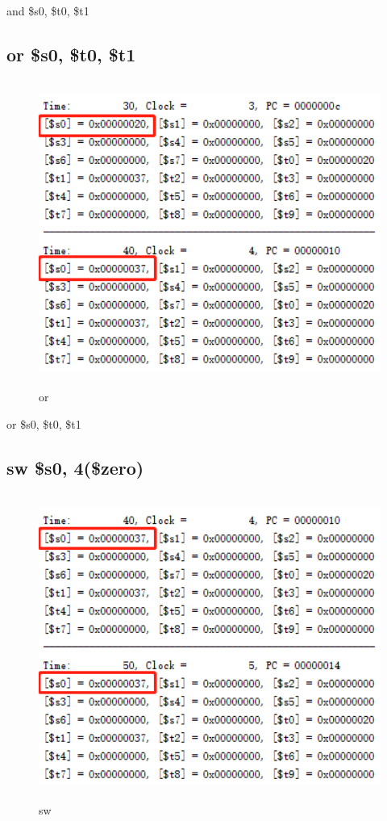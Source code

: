 \documentclass{article}
\begin{document}
and \$s0, \$t0, \$t1

\subsection{or \$s0, \$t0, \$t1}
\begin{figure}[H]
    \centering
    \includegraphics[height = 10cm,width = 13cm]{or.png}
    \caption{or}
    \label{fig:my_label}
\end{figure}

or \$s0, \$t0, \$t1
\subsection{sw \$s0, 4(\$zero)}
\begin{figure}[H]
    \centering
    \includegraphics[height = 10cm,width = 13cm]{sw.png}
    \caption{sw}
    \label{fig:my_label}
\end{figure}
\end{document}

